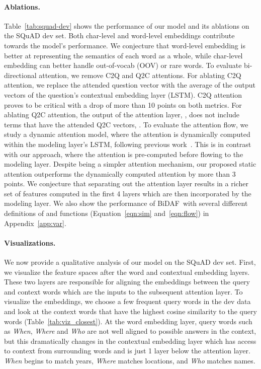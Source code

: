 \documentclass{article} \usepackage{iclr2017_conference,times}
\newcommand{\sysshort}{\mbox{\sc BiDAF}}
\begin{document}
\paragraph{Ablations.} Table~\ref{tab:squad-dev} shows the performance of our model and its ablations on the SQuAD dev set. Both char-level and word-level embeddings contribute towards the model's performance. We conjecture that word-level embedding is better at representing the semantics of each word as a whole, while char-level embedding can better handle out-of-vocab (OOV) or rare words. To evaluate bi-directional attention, we remove C2Q and Q2C attentions. For ablating C2Q attention, we replace the attended question vector  with the average of the output vectors of the question's contextual embedding layer (LSTM). C2Q attention proves to be critical with a drop of more than 10 points on both metrics. For ablating Q2C attention, the output of the attention layer, , does not include terms that have the attended Q2C vectors, . To evaluate the attention flow, we study a dynamic attention model, where the attention is dynamically computed within the modeling layer's LSTM, following previous work~\citep{Bahdanau2014NeuralMT,wang2016machine}. This is in contrast with our approach, where the attention is pre-computed before flowing to the modeling layer. Despite being a simpler attention mechanism, our proposed static attention outperforms the dynamically computed attention by more than 3 points. We conjecture that separating out the attention layer results in a richer set of features computed in the first 4 layers which are then incorporated by the modeling layer.
We also show the performance of \sysshort\ with several different definitions of  and  functions (Equation~\ref{eqn:sim} and~\ref{eqn:flow}) in Appendix~\ref{app:var}.

\paragraph{Visualizations.} We now provide a qualitative analysis of our model on the SQuAD dev set. First, we visualize the feature spaces after the word and contextual embedding layers. These two layers are responsible for aligning the embeddings between the query and context words which are the inputs to the subsequent attention layer. To visualize the embeddings, we choose a few frequent query words in the dev data and look at the context words that have the highest cosine similarity to the query words (Table~\ref{tab:viz_closest}). At the word embedding layer, query words such as \textit{When}, \textit{Where} and \textit{Who} are not well aligned to possible answers in the context, but this dramatically changes in the contextual embedding layer which has access to context from surrounding words and is just 1 layer below the attention layer. \textit{When} begins to match years, \textit{Where} matches locations, and \textit{Who} matches names. 
\end{document}
